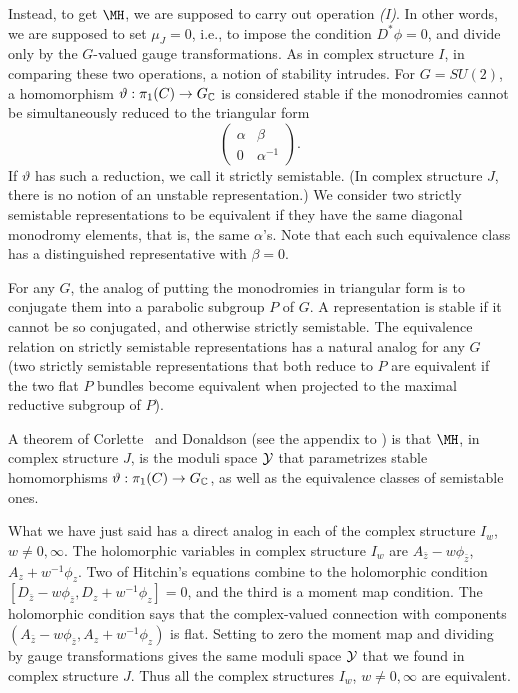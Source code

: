 Instead, to get $\MH$, we are supposed to carry out operation {\it
(I)}.  In other words, we are supposed to set $\mu_J=0$, i.e., to
impose the condition $D^*\phi=0$, and divide only by the
$G$-valued gauge transformations.  As  in complex structure $I$,
in comparing these two operations, a notion of stability intrudes.
For $G=SU(2)$, a homomorphism $\vartheta:\pi_1(C)\to G_{\Bbb{C}}$
is considered stable if the monodromies cannot be simultaneously
reduced to the triangular form %
\setcounter{equation}{21}
\begin{equation}\label{eq:yto}
\left(\begin{matrix} \alpha &
\beta \\ 0 & \alpha^{-1}\end{matrix}\right).
\end{equation}
   If $\vartheta$ has such a
reduction, we call it strictly semistable.  (In complex structure
$J$, there is no notion of an unstable representation.) We
consider two strictly semistable representations to be equivalent
if they have the same diagonal monodromy elements, that is, the
same $\alpha$'s.  Note that each such equivalence class has a
distinguished representative with $\beta=0$.

For any $G$, the analog of putting the monodromies in triangular
form is to conjugate them into a parabolic subgroup $P$ of $G$.  A
representation is stable if it cannot be so conjugated, and
otherwise strictly semistable.  The equivalence relation on
strictly semistable representations has a natural analog for any
$G$ (two strictly semistable representations that both reduce to
$P$ are equivalent if the two flat $P$ bundles become equivalent
when projected to the maximal reductive subgroup of $P$).

A theorem of Corlette \cite{ref58}\ and Donaldson  (see the appendix
to \cite{ref20}) is that $\MH$, in complex structure $J$, is  the
moduli space ${{\cal Y}}$ that parametrizes stable homomorphisms
$\vartheta:\pi_1(C)\to G_{\Bbb{C}}$, as well as the equivalence
classes of semistable ones.

\par{}

What we have just said has a direct analog in each of the complex
structure $I_w$, $w\not= 0,\infty$.  The holomorphic  variables in
complex structure $I_w$ are $A_{\bar z}-w\phi_{\bar z}$,
$A_z+w^{-1}\phi_z$.  Two of Hitchin's equations combine to the
holomorphic condition $[D_{\bar z}-w\phi_{\bar
z},D_z+w^{-1}\phi_z]=0$, and the third is a moment map condition.
The holomorphic condition says that the complex-valued connection
with components $(A_{\bar z}-w\phi_{\bar z},A_z+w^{-1}\phi_z)$ is
flat.  Setting to zero the moment map and dividing by gauge
transformations gives the same moduli space ${{\cal Y}}$ that we
found in complex structure $J$.  Thus all the complex structures
$I_w$, $w\not=0,\infty$ are equivalent.


